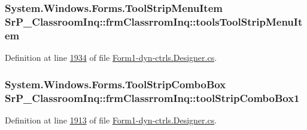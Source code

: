 \hypertarget{class_sr_p___classroom_inq_1_1frm_classrrom_inq_a89a0ae0ac6568cec51bb828874802c28}{
\subsubsection[{tools\-Tool\-Strip\-Menu\-Item}]{\setlength{\rightskip}{0pt plus 5cm}\-System.\-Windows.\-Forms.\-Tool\-Strip\-Menu\-Item {\bf \-Sr\-P\-\_\-\-Classroom\-Inq\-::frm\-Classrrom\-Inq\-::tools\-Tool\-Strip\-Menu\-Item}}}
\label{class_sr_p___classroom_inq_1_1frm_classrrom_inq_a89a0ae0ac6568cec51bb828874802c28}


\-Definition at line \hyperlink{_form1-dyn-ctrls_8_designer_8cs_source_l01934}{1934} of file \hyperlink{_form1-dyn-ctrls_8_designer_8cs_source}{\-Form1-\/dyn-\/ctrls.\-Designer.\-cs}.

\hypertarget{class_sr_p___classroom_inq_1_1frm_classrrom_inq_a0488696265840798a7bfd3cc7475f0af}{
\subsubsection[{tool\-Strip\-Combo\-Box1}]{\setlength{\rightskip}{0pt plus 5cm}\-System.\-Windows.\-Forms.\-Tool\-Strip\-Combo\-Box {\bf \-Sr\-P\-\_\-\-Classroom\-Inq\-::frm\-Classrrom\-Inq\-::tool\-Strip\-Combo\-Box1}}}
\label{class_sr_p___classroom_inq_1_1frm_classrrom_inq_a0488696265840798a7bfd3cc7475f0af}


\-Definition at line \hyperlink{_form1-dyn-ctrls_8_designer_8cs_source_l01913}{1913} of file \hyperlink{_form1-dyn-ctrls_8_designer_8cs_source}{\-Form1-\/dyn-\/ctrls.\-Designer.\-cs}.


